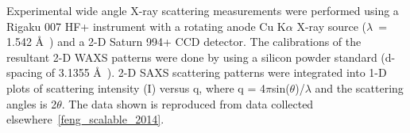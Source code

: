 \documentclass{article}
\newcommand{\angstrom}{\textup{\AA}}
\begin{document}
  
  
  Experimental wide angle X-ray scattering measurements were performed using a 
  Rigaku 007 HF+ instrument with a rotating anode Cu K$\alpha$ X-ray source
  ($\lambda$~= 1.542 \angstrom~) and a 2-D Saturn 994+ CCD detector. The 
  calibrations of the resultant 2-D WAXS patterns were done by using a 
  silicon powder standard (d-spacing of 3.1355 \angstrom~). 2-D SAXS scattering
  patterns were integrated into 1-D plots of scattering intensity (I) versus
  q, where q = 4$\pi$sin($\theta$)/$\lambda$ and the scattering angles is
  2$\theta$. The data shown is reproduced from data collected elsewhere~\ref{feng_scalable_2014}.
\end{document}
